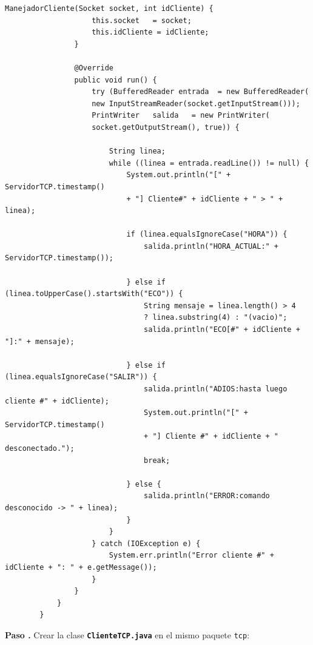 \documentclass[12pt, a4paper, openany]{book}
\newcounter{paso}[section]
\newcommand{\paso}[1]{%
	\stepcounter{paso}%
	\medskip\noindent
	\begin{tcolorbox}[enhanced, colback=white, colframe=practiceBlue,
		boxrule=0.8pt, arc=3pt, left=6pt, right=6pt, top=4pt, bottom=4pt,
		before upper={\noindent}]
		\textcolor{practiceBlue}{\textbf{Paso \arabic{paso}.}} #1
	\end{tcolorbox}%
}
\newcommand{\code}[1]{\texttt{\small#1}}
\newcommand{\archivo}[1]{\texttt{\textbf{#1}}}
\begin{document}
\begin{lstlisting}[style=JavaStyle, caption={ServidorTCP.java --- Servidor multihilo con ThreadPool}]
				ManejadorCliente(Socket socket, int idCliente) {
					this.socket   = socket;
					this.idCliente = idCliente;
				}
				
				@Override
				public void run() {
					try (BufferedReader entrada  = new BufferedReader(
					new InputStreamReader(socket.getInputStream()));
					PrintWriter   salida   = new PrintWriter(
					socket.getOutputStream(), true)) {
						
						String linea;
						while ((linea = entrada.readLine()) != null) {
							System.out.println("[" + ServidorTCP.timestamp()
							+ "] Cliente#" + idCliente + " > " + linea);
							
							if (linea.equalsIgnoreCase("HORA")) {
								salida.println("HORA_ACTUAL:" + ServidorTCP.timestamp());
								
							} else if (linea.toUpperCase().startsWith("ECO")) {
								String mensaje = linea.length() > 4
								? linea.substring(4) : "(vacio)";
								salida.println("ECO[#" + idCliente + "]:" + mensaje);
								
							} else if (linea.equalsIgnoreCase("SALIR")) {
								salida.println("ADIOS:hasta luego cliente #" + idCliente);
								System.out.println("[" + ServidorTCP.timestamp()
								+ "] Cliente #" + idCliente + " desconectado.");
								break;
								
							} else {
								salida.println("ERROR:comando desconocido -> " + linea);
							}
						}
					} catch (IOException e) {
						System.err.println("Error cliente #" + idCliente + ": " + e.getMessage());
					}
				}
			}
		}
	\end{lstlisting}
	
	\paso{Crear la clase \archivo{ClienteTCP.java} en el mismo paquete \code{tcp}:}
	
\end{document}
